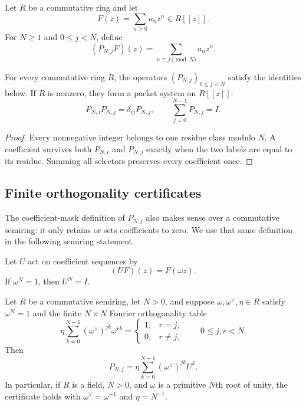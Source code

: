 \begin{definition}\label{def:residue_selector}
Let $R$ be a commutative ring and let
\[
F(z)=\sum_{n\geq0}a_nz^n\in R[[z]].
\]
For $N\geq1$ and $0\leq j<N$, define
\[
(P_{N,j}F)(z)
=
\sum_{n\equiv j\pmod N}a_nz^n.
\]
\end{definition}

\begin{proposition}\label{prop:residue_algebra}\label{prop:residue-algebra}
For every commutative ring $R$, the operators $(P_{N,j})_{0\leq j<N}$ satisfy the identities below.  If $R$ is nonzero, they form a packet system on $R[[z]]$:
\[
P_{N,i}P_{N,j}=\delta_{ij}P_{N,j},
\qquad
\sum_{j=0}^{N-1}P_{N,j}=I.
\]
\end{proposition}

\begin{proof}
Every nonnegative integer belongs to one residue class modulo $N$.  A coefficient survives both $P_{N,i}$ and $P_{N,j}$ exactly when the two labels are equal to its residue.  Summing all selectors preserves every coefficient once.
\end{proof}

\subsection{Finite orthogonality certificates}

The coefficient-mask definition of $P_{N,j}$ also makes sense over a commutative semiring: it only retains or sets coefficients to zero. We use that same definition in the following semiring statement.

Let $U$ act on coefficient sequences by
\[
(UF)(z)=F(\omega z).
\]
If $\omega^N=1$, then $U^N=I$.

\begin{theorem}\label{thm:root-of-unity}
Let $R$ be a commutative semiring, let $N>0$, and suppose
$\omega,\omega^\vee,\eta\in R$ satisfy $\omega^N=1$ and the finite
$N\times N$ Fourier orthogonality table
\[
\eta\sum_{k=0}^{N-1}(\omega^\vee)^{jk}\omega^{rk}
=
\begin{cases}
1,&r=j,\\
0,&r\ne j,
\end{cases}
\qquad 0\le j,r<N.
\]
Then
\[
\boxed{
P_{N,j}
=
\eta\sum_{k=0}^{N-1}(\omega^\vee)^{jk}U^k.
}
\]
In particular, if $R$ is a field, $N>0$, and $\omega$ is a primitive
$N$th root of unity, the certificate holds with
$\omega^\vee=\omega^{-1}$ and $\eta=N^{-1}$.
\end{theorem}

